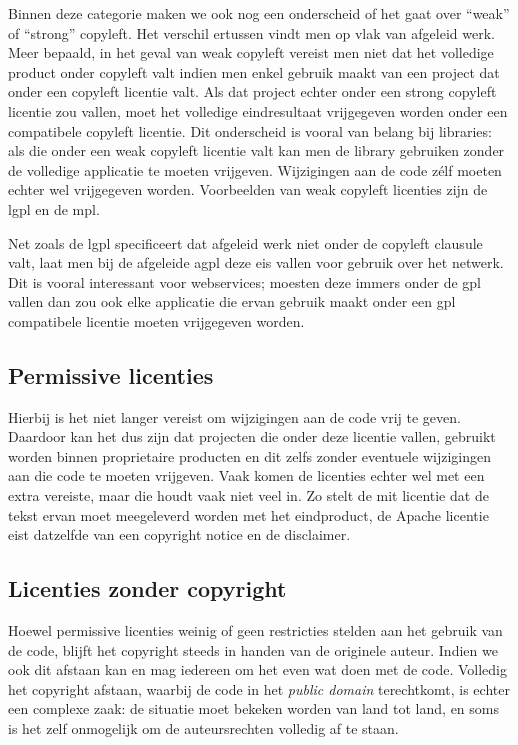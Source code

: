 Binnen deze categorie maken we ook nog een onderscheid of het gaat over ``weak'' of ``strong'' copyleft. Het verschil ertussen vindt men op vlak van afgeleid werk. Meer bepaald, in het geval van weak copyleft vereist men niet dat het volledige product onder copyleft valt indien men enkel gebruik maakt van een project dat onder een copyleft licentie valt. Als dat project echter onder een strong copyleft licentie zou vallen, moet het volledige eindresultaat vrijgegeven worden onder een compatibele copyleft licentie.
Dit onderscheid is vooral van belang bij libraries: als die onder een weak copyleft licentie valt kan men de library gebruiken zonder de volledige applicatie te moeten vrijgeven. Wijzigingen aan de code zélf moeten echter wel vrijgegeven worden. Voorbeelden van weak copyleft licenties zijn de \ac{lgpl} en de \ac{mpl}.

Net zoals de \ac{lgpl} specificeert dat afgeleid werk niet onder de copyleft clausule valt, laat men bij de afgeleide \ac{agpl} deze eis vallen voor gebruik over het netwerk. Dit is vooral interessant voor webservices; moesten deze immers onder de \ac{gpl} vallen dan zou ook elke applicatie die ervan gebruik maakt onder een \ac{gpl} compatibele licentie moeten vrijgegeven worden.

\subsection{Permissive licenties}
\label{ontwerp:licenties:type:permissive}

Hierbij is het niet langer vereist om wijzigingen aan de code vrij te geven. Daardoor kan het dus zijn dat projecten die onder deze licentie vallen, gebruikt worden binnen proprietaire producten en dit zelfs zonder eventuele wijzigingen aan die code te moeten vrijgeven. Vaak komen de licenties echter wel met een extra vereiste, maar die houdt vaak niet veel in. Zo stelt de \ac{mit} licentie dat de tekst ervan moet meegeleverd worden met het eindproduct, de Apache licentie eist datzelfde van een copyright notice en de disclaimer.

\subsection{Licenties zonder copyright}
\label{ontwerp:licenties:type:public}

Hoewel permissive licenties weinig of geen restricties stelden aan het gebruik van de code, blijft het copyright steeds in handen van de originele auteur. Indien we ook dit afstaan kan en mag iedereen om het even wat doen met de code. Volledig het copyright afstaan, waarbij de code in het \emph{public domain} terechtkomt, is echter een complexe zaak: de situatie moet bekeken worden van land tot land, en soms is het zelf onmogelijk om de auteursrechten volledig af te staan.

